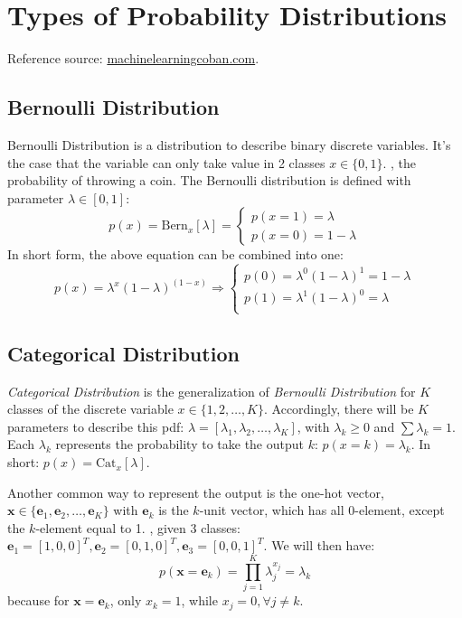 \section{Types of Probability Distributions}
Reference source: \href{https://machinelearningcoban.com/2017/07/09/prob/}{machinelearningcoban.com}.
\subsection{Bernoulli Distribution}
Bernoulli Distribution is a distribution to describe binary discrete variables. It's the case that the variable can only take value in 2 classes $x \in \{0,1\}$. \Eg, the probability of throwing a coin. The Bernoulli distribution is defined with parameter $\lambda \in[0,1]$:
\begin{equation}
	p(x) = \text{Bern}_x[\lambda] = \begin{cases}
		p(x=1) = \lambda\\
		p(x=0) = 1-\lambda
	\end{cases}
\end{equation}
In short form, the above equation can be combined into one:
\begin{equation}
	p(x) = \lambda^x(1-\lambda)^{(1-x)} \Rightarrow
	\begin{cases}
		p(0) = \lambda^0 (1-\lambda)^1 = 1-\lambda \\
		p(1) = \lambda^1 (1-\lambda)^0 = \lambda \\
	\end{cases}
\end{equation}

\subsection{Categorical Distribution}
\label{subsec:categorical-distribution}
\textit{Categorical Distribution} is the generalization of \textit{Bernoulli Distribution} for $K$ classes of the discrete variable $x \in \{ 1, 2, \dots, K\}$. Accordingly, there will be $K$ parameters to describe this \ac{pdf}: $\lambda = [\lambda_1, \lambda_2, \dots, \lambda_K]$, with $\lambda_k \geq 0$ and $\sum \lambda_k = 1$. Each $\lambda_k$ represents the probability to take the output $k$: $p(x = k) = \lambda_k$. In short: $p(x) = \text{Cat}_x [\lambda]$.

Another common way to represent the output is the one-hot vector, $\mathbf{x} \in \{\mathbf{e}_1, \mathbf{e}_2, \dots, \mathbf{e}_K\}$ with $\mathbf{e}_k$ is the $k$-unit vector, which has all 0-element, except the $k$-element equal to 1. \Eg, given 3 classes: $\textbf{e}_1 = [1, 0, 0]^T, \textbf{e}_2 = [0, 1, 0]^T, \textbf{e}_3 = [0, 0, 1]^T$. We will then have:
\begin{equation}
	p(\mathbf{x} = \mathbf{e}_k) = \prod_{j=1}^K \lambda_j^{x_j} = \lambda_k
\end{equation}
because for $\textbf{x}=\textbf{e}_k$, only $x_k=1$, while $x_j = 0, \forall j\neq k$.

